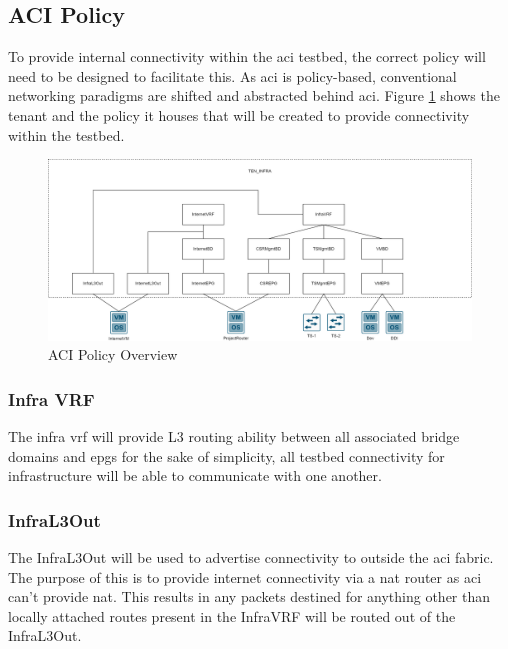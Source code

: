 \subsection{ACI Policy}
\label{design:Testbed:network-design:aci-policy}
To provide internal
connectivity within the \gls{aci} testbed, the correct policy will need to be
designed to facilitate this. As \gls{aci} is policy-based, conventional
networking paradigms are shifted and abstracted behind \gls{aci}. Figure
\ref{fig:epg-topology} shows the tenant and the policy it houses that will be
created to provide connectivity within the testbed.

\begin{figure}[H]

    \centering
    \includegraphics[scale=0.17]{images/epg-topology.png}

    \caption{ACI Policy Overview}
    \label{fig:epg-topology}
\end{figure}

\subsubsection{Infra VRF}
The infra \gls{vrf} will provide L3 routing ability
between all associated bridge domains and \gls{epg}s for the sake of
simplicity, all testbed connectivity for infrastructure will be able to
communicate with one another.

\subsubsection{InfraL3Out}
The InfraL3Out will
be used to advertise connectivity to outside the \gls{aci} fabric. The purpose
of this is to provide internet connectivity via a \gls{nat} router as \gls{aci}
can't provide \gls{nat}. This results in any packets destined for anything
other than locally attached routes present in the InfraVRF will be routed out
of the InfraL3Out.

